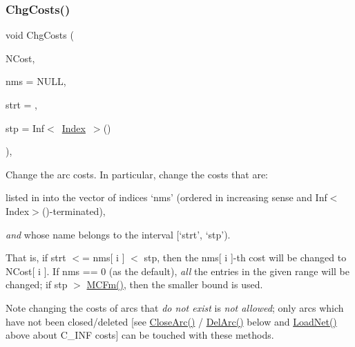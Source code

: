 \subsubsection{\texorpdfstring{Chg\+Costs()}{ChgCosts()}}
{\footnotesize\ttfamily void Chg\+Costs (\begin{DoxyParamCaption}\item[{\mbox{\hyperlink{class_m_c_f_class_ab700102e9ba8bb6015be6818d4e99097}{c\+C\+Row}}}]{N\+Cost,  }\item[{\mbox{\hyperlink{class_m_c_f_class_a81575b2d4e4d5636b17170432150ae69}{c\+Index\+\_\+\+Set}}}]{nms = {\ttfamily NULL},  }\item[{\mbox{\hyperlink{class_m_c_f_class_a76aaabb20535c51a2752b93f6c38fe54}{c\+Index}}}]{strt = {},  }\item[{\mbox{\hyperlink{class_m_c_f_class_ad53d6229d7ec28555a9c9c2fd9abf773}{Index}}}]{stp = {\ttfamily Inf$<$~\mbox{\hyperlink{class_m_c_f_class_ad53d6229d7ec28555a9c9c2fd9abf773}{Index}}~$>$()} }\end{DoxyParamCaption})\hspace{0.3cm}{\ttfamily [override]}, {\ttfamily [virtual]}}

Change the arc costs. In particular, change the costs that are\+:


\begin{DoxyItemize}
\item listed in into the vector of indices `nms' (ordered in increasing sense and Inf$<$\+Index$>$()-\/terminated),
\item {\itshape and} whose name belongs to the interval \mbox{[}`strt', `stp').
\end{DoxyItemize}

That is, if strt $<$= nms\mbox{[} i \mbox{]} $<$ stp, then the nms\mbox{[} i \mbox{]}-\/th cost will be changed to N\+Cost\mbox{[} i \mbox{]}. If nms == 0 (as the default), {\itshape all} the entries in the given range will be changed; if stp $>$ \mbox{\hyperlink{class_m_c_f_class_ab4d5a0d0fc49882de0b4eb3146f1b7a6}{M\+C\+Fm()}}, then the smaller bound is used.

\begin{DoxyNote}{Note}
changing the costs of arcs that {\itshape do not exist} is {\itshape not allowed}; only arcs which have not been closed/deleted \mbox{[}see \mbox{\hyperlink{class_m_c_f_cplex_a4a964ce79159307998f5acd0018d01b1}{Close\+Arc()}} / \mbox{\hyperlink{class_m_c_f_cplex_a3b6145c95b83f40a76d724eb2b92f80f}{Del\+Arc()}} below and \mbox{\hyperlink{class_m_c_f_cplex_ac270d18d58fd6fe88164cde1f4c80aff}{Load\+Net()}} above about C\+\_\+\+I\+NF costs\mbox{]} can be touched with these methods. 
\end{DoxyNote}


